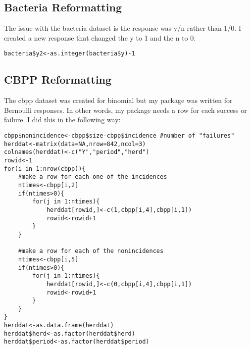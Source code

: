 \documentclass{article}
\begin{document}
\subsection{Bacteria Reformatting}
The issue with the bacteria dataset is the response was y/n rather than 1/0. I created a new response that changed the y to 1 and the n to 0.

\begin{verbatim}
bacteria$y2<-as.integer(bacteria$y)-1
\end{verbatim}
\subsection{CBPP Reformatting}
The cbpp dataset was created for binomial but my package was written for Bernoulli responses. In other words, my package needs a row for each success or failure. I did this in the following way:
\begin{verbatim}
cbpp$nonincidence<-cbpp$size-cbpp$incidence #number of "failures"
herddat<-matrix(data=NA,nrow=842,ncol=3)
colnames(herddat)<-c("Y","period","herd")
rowid<-1
for(i in 1:nrow(cbpp)){
	#make a row for each one of the incidences 
	ntimes<-cbpp[i,2]
	if(ntimes>0){	
		for(j in 1:ntimes){
			herddat[rowid,]<-c(1,cbpp[i,4],cbpp[i,1])
			rowid<-rowid+1
		}
	}
	
	#make a row for each of the nonincidences
	ntimes<-cbpp[i,5]
	if(ntimes>0){	
		for(j in 1:ntimes){
			herddat[rowid,]<-c(0,cbpp[i,4],cbpp[i,1])
			rowid<-rowid+1
		}
	}
}
herddat<-as.data.frame(herddat)
herddat$herd<-as.factor(herddat$herd)
herddat$period<-as.factor(herddat$period)
\end{verbatim}
\end{document}
